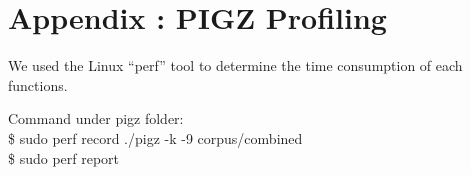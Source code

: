 \section{Appendix : PIGZ Profiling}
We used the Linux “perf” tool to determine the time consumption of each functions.

Command under pigz folder:\\
{\color{blue} \$ sudo perf record ./pigz -k -9 corpus/combined}\\
{\color{blue} \$ sudo perf report}\\


